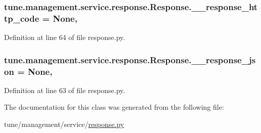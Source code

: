 \hypertarget{classtune_1_1management_1_1service_1_1response_1_1Response_a92924ef057f2e75f8238f3761e418fca}{
\subsubsection[{\-\_\-\-\_\-response\-\_\-http\-\_\-code}]{\setlength{\rightskip}{0pt plus 5cm}tune.\-management.\-service.\-response.\-Response.\-\_\-\-\_\-response\-\_\-http\-\_\-code = None\hspace{0.3cm}{\ttfamily [static]}, {\ttfamily [private]}}}\label{classtune_1_1management_1_1service_1_1response_1_1Response_a92924ef057f2e75f8238f3761e418fca}


Definition at line 64 of file response.\-py.

\hypertarget{classtune_1_1management_1_1service_1_1response_1_1Response_a7204647871c6fae73990626219ba1edf}{
\subsubsection[{\-\_\-\-\_\-response\-\_\-json}]{\setlength{\rightskip}{0pt plus 5cm}tune.\-management.\-service.\-response.\-Response.\-\_\-\-\_\-response\-\_\-json = None\hspace{0.3cm}{\ttfamily [static]}, {\ttfamily [private]}}}\label{classtune_1_1management_1_1service_1_1response_1_1Response_a7204647871c6fae73990626219ba1edf}


Definition at line 63 of file response.\-py.



The documentation for this class was generated from the following file\-:\begin{DoxyCompactItemize}
\item 
tune/management/service/\hyperlink{response_8py}{response.\-py}\end{DoxyCompactItemize}
